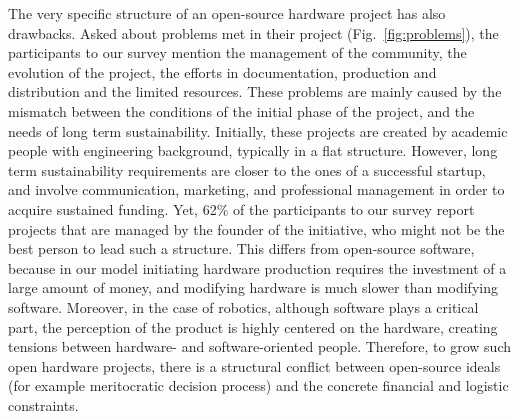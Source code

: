 \documentclass[letterpaper, 10 pt, conference]{ieeeconf}  %
\begin{document}
The very specific structure of an open-source hardware project has also drawbacks. 
Asked about problems met in their project (Fig.~\ref{fig:problems}), the participants to our survey mention the management of the community, the evolution of the project, the efforts in documentation, production and distribution and the limited resources.
These problems are mainly caused by the mismatch between the conditions of the initial phase of the project, and the needs of long term sustainability.
Initially, these projects are created by academic people with engineering background, typically in a flat structure.
However, long term sustainability requirements are closer to the ones of a successful startup, and involve communication, marketing, and professional management in order to acquire sustained funding.
Yet, 62\% of the participants to our survey report projects that are managed by the founder of the initiative, who might not be the best person to lead such a structure.
This differs from open-source software, because in our model initiating hardware production requires the investment of a large amount of money, and modifying hardware is much slower than modifying software.
Moreover, in the case of robotics, although software plays a critical part, the perception of the product is highly centered on the hardware, creating tensions between hardware- and software-oriented people.
Therefore, to grow such open hardware projects, there is a structural conflict between open-source ideals (for example meritocratic decision process) and the concrete financial and logistic constraints.

\end{document}
